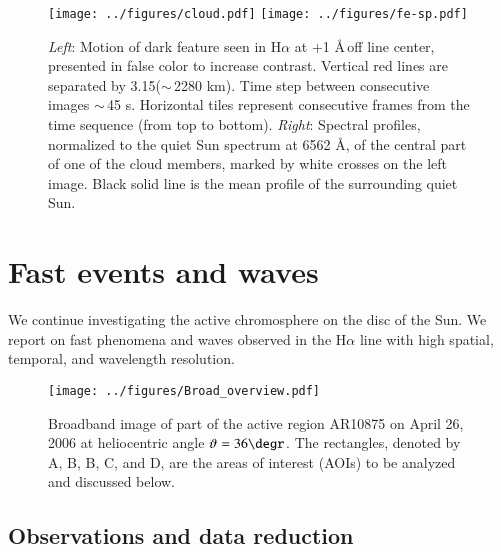 \begin{sidewaysfigure}
\centering
\texttt{[image: ../figures/cloud.pdf]}
\texttt{[image: ../figures/fe-sp.pdf]}
\caption{\emph{Left}: Motion of dark feature seen in H$\alpha$ at +1 \AA\,off line center, presented in false color to increase contrast. Vertical red lines are separated by 3.15\arcsec ($\sim$\,2280 km). Time step between consecutive images $\sim$\,45 s. Horizontal tiles represent consecutive frames from the time sequence (from top to bottom). \emph{Right}: Spectral profiles, normalized to the quiet Sun spectrum at 6562 \AA, of the central part of one of the cloud members, marked by white crosses on the left image.  Black solid line is the mean profile of the surrounding quiet Sun.}
\label{fig:cloud}
\label{fig:sp}
\end{sidewaysfigure}


\clearpage

\section{Fast events and waves}

We continue investigating the active chromosphere on the disc of the Sun. We report on fast phenomena and waves observed in the H$\alpha$ line with high spatial, temporal, and wavelength resolution.



\begin{figure}
\centering
\texttt{[image: ../figures/Broad\_overview.pdf]} 
\caption{Broadband image of part of the active region AR10875 on  April 26,
  2006 at heliocentric angle $\vartheta=36\degr$. The rectangles, denoted by
  A, B, B\arcmin, C, and D, are the areas of interest (AOIs) to be analyzed and discussed below. }%
\label{fig1}
\end{figure}








\subsection{Observations and data reduction\label{observations}\label{obser}\label{analysis}}

